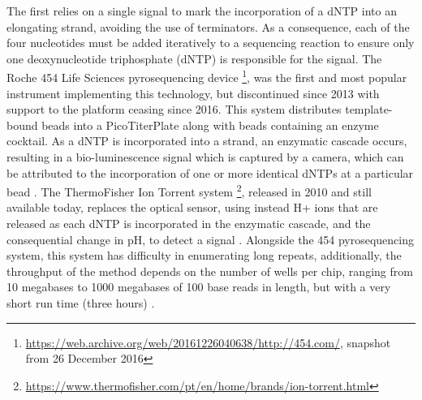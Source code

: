 The first relies on a single signal to mark the incorporation of a dNTP into an elongating strand, avoiding the use of terminators. 
As a consequence, each of the four nucleotides must be added iteratively to a sequencing reaction to ensure only one deoxynucleotide triphosphate (dNTP) is responsible for the signal. 
The Roche 454 Life Sciences pyrosequencing device \footnote{\url{https://web.archive.org/web/20161226040638/http://454.com/}, snapshot from 26 December 2016}, was the first and most popular instrument implementing this technology, but discontinued since 2013 with support to the platform ceasing since 2016. 
This system distributes template-bound beads into a PicoTiterPlate along with beads containing an enzyme cocktail. 
As a dNTP is incorporated into a strand, an enzymatic cascade occurs, resulting in a bio-luminescence signal which is captured by a camera, which can be attributed to the incorporation of one or more identical dNTPs at a particular bead \citep{goodwin_coming_2016}. 
The ThermoFisher Ion Torrent system \footnote{\url{https://www.thermofisher.com/pt/en/home/brands/ion-torrent.html}}, released in 2010 and still available today, replaces the optical sensor, using instead  H+ ions that are released as each dNTP is incorporated in the enzymatic cascade, and the consequential change in pH, to detect a signal \citep{goodwin_coming_2016}. 
Alongside the 454 pyrosequencing system, this system has difficulty in enumerating long repeats, additionally, the throughput of the method depends on the number of wells per chip, ranging from 10 megabases to 1000 megabases of 100 base reads in length, but with a very short run time (three hours) \citep{hagemann_overview_2015, loman_performance_2012}.

